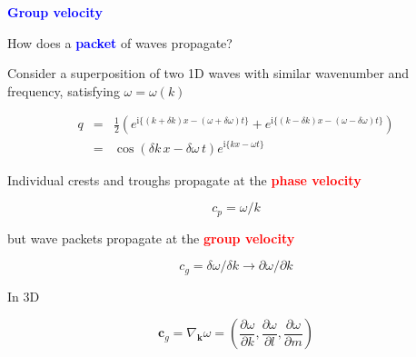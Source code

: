 \documentclass[a4]{seminar}
\newcommand{\ii}{\mathrm{i}}
\newcommand{\R}[1]{\textcolor{red}{#1}}
\newcommand{\B}[1]{\textcolor{blue}{#1}}
\begin{document}
\begin{slide}

\B{\bf Group velocity}

\vspace{3mm}

How does a \B{\bf packet} of waves propagate?

Consider a superposition of two 1D waves with similar wavenumber and
frequency, satisfying \( \omega = \omega(k) \)

\begin{eqnarray}
q & = & \frac{1}{2} \left(
e^{\ii \{ (k + \delta k) x - (\omega + \delta \omega) t\} }
+
e^{\ii \{ (k - \delta k) x - (\omega - \delta \omega) t\} }
\right) \nonumber \\
 & = &
\cos (\delta k \, x - \delta \omega \, t)
e^{\ii \{ k x - \omega t\} }
\end{eqnarray}


\begin{center}
\end{center}


\end{slide}


\begin{slide}

Individual crests and troughs propagate at the \R{\bf phase velocity}

\begin{displaymath}
c_p = \omega / k
\end{displaymath}

but wave packets propagate at the \R{\bf group velocity}

\begin{displaymath}
c_g = \delta \omega / \delta k \rightarrow \partial \omega / \partial k
\end{displaymath}

In 3D

\begin{displaymath}
\mathbf{c}_g = \nabla_{\mathbf{k}} \omega
= \left( \frac{\partial \omega}{\partial k} ,
         \frac{\partial \omega}{\partial l} ,
         \frac{\partial \omega}{\partial m} \right)
\end{displaymath}


\end{slide}

\end{document}
